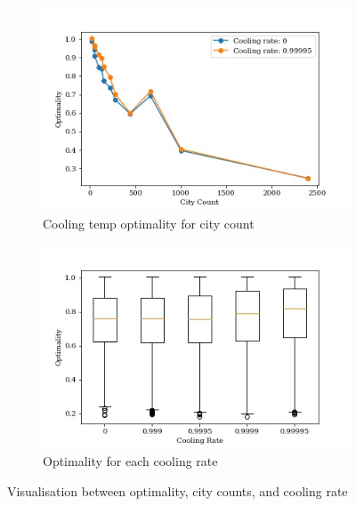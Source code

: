 \documentclass{article}
\begin{document}
\begin{figure}[H]
\centering
    \begin{subfigure}{0.45\textwidth}
        \centering
        \includegraphics[width=1\linewidth]{images/tsplib_optimality_city_count.jpg}
        \caption{Cooling temp optimality for city count}
        \label{fig:sub1}
    \end{subfigure}%
    \begin{subfigure}{0.45\textwidth}
        \centering
        \includegraphics[width=1\linewidth]{images/tsplib_optimality_cooling_rate.jpg}
        \caption{Optimality for each cooling rate}
        \label{fig:sub2}
    \end{subfigure}
    \caption{Visualisation between optimality, city counts, and cooling rate}
\end{figure}
\end{document}
